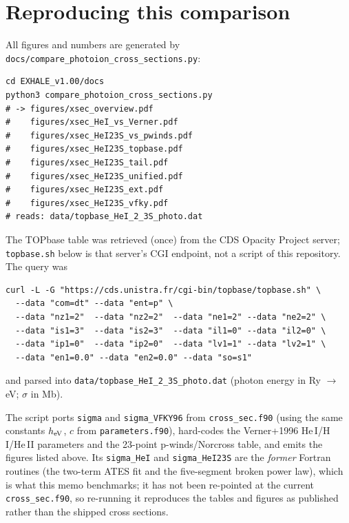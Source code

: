 \documentclass[english,a4paper]{my_memo}
\newcommand{\sig}{\sigma}
\begin{document}
\section{Reproducing this comparison}\label{sec:script}

All figures and numbers are generated by
\texttt{docs/compare\_photoion\_cross\_sections.py}:

\begin{verbatim}
cd EXHALE_v1.00/docs
python3 compare_photoion_cross_sections.py
# -> figures/xsec_overview.pdf
#    figures/xsec_HeI_vs_Verner.pdf
#    figures/xsec_HeI23S_vs_pwinds.pdf
#    figures/xsec_HeI23S_topbase.pdf
#    figures/xsec_HeI23S_tail.pdf
#    figures/xsec_HeI23S_unified.pdf
#    figures/xsec_HeI23S_ext.pdf
#    figures/xsec_HeI23S_vfky.pdf
# reads: data/topbase_HeI_2_3S_photo.dat
\end{verbatim}

The TOPbase table was retrieved (once) from the CDS Opacity Project server;
\texttt{topbase.sh} below is that server's CGI endpoint, not a script of this
repository. The query was
\begin{verbatim}
curl -L -G "https://cds.unistra.fr/cgi-bin/topbase/topbase.sh" \
  --data "com=dt" --data "ent=p" \
  --data "nz1=2"  --data "nz2=2"  --data "ne1=2" --data "ne2=2" \
  --data "is1=3"  --data "is2=3"  --data "il1=0" --data "il2=0" \
  --data "ip1=0"  --data "ip2=0"  --data "lv1=1" --data "lv2=1" \
  --data "en1=0.0" --data "en2=0.0" --data "so=s1"
\end{verbatim}
and parsed into \texttt{data/topbase\_HeI\_2\_3S\_photo.dat} (photon
energy in Ry $\to$ eV; $\sig$ in Mb).

The script ports \texttt{sigma} and \texttt{sigma\_VFKY96} from
\texttt{cross\_sec.f90} (using the same constants $h_{\rm eV}$, $c$ from
\texttt{parameters.f90}), hard-codes the Verner+1996 He\,I/H\,I/He\,II
parameters and the 23-point p-winds/Norcross table, and emits the figures listed
above. Its \texttt{sigma\_HeI} and \texttt{sigma\_HeI23S} are the \emph{former}
Fortran routines (the two-term ATES fit and the five-segment broken power law),
which is what this memo benchmarks; it has not been re-pointed at the
current \texttt{cross\_sec.f90}, so re-running it reproduces the tables and
figures as published rather than the shipped cross sections.
\end{document}
